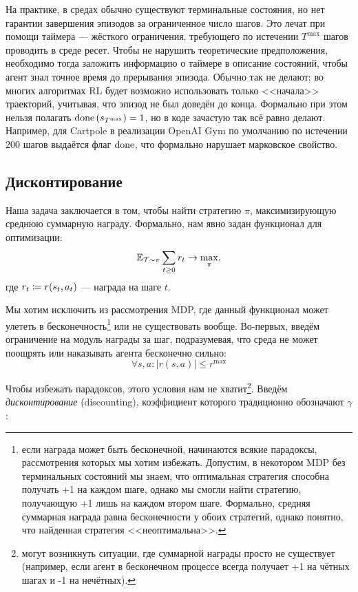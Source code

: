 \begin{remark}
На практике, в средах обычно существуют терминальные состояния, но нет гарантии завершения эпизодов за ограниченное число шагов. Это лечат при помощи таймера --- жёсткого ограничения, требующего по истечении $T^{\max}$ шагов проводить в среде ресет. Чтобы не нарушить теоретические предположения, необходимо тогда заложить информацию о таймере в описание состояний, чтобы агент знал точное время до прерывания эпизода. Обычно так не делают; во многих алгоритмах RL будет возможно использовать только <<начала>> траекторий, учитывая, что эпизод не был доведён до конца. Формально при этом нельзя полагать $\done \left( s_{T^{\max}} \right) \HM= 1$, но в коде зачастую так всё равно делают. Например, для Cartpole в реализации OpenAI Gym по умолчанию по истечении 200 шагов выдаётся флаг $\mathrm{done}$, что формально нарушает марковское свойство.
\end{remark}

\subsection{Дисконтирование}

Наша задача заключается в том, чтобы найти стратегию $\pi$, максимизирующую среднюю суммарную награду. Формально, нам явно задан функционал для оптимизации:
\begin{equation}\label{sumreward}
\mathbb{E}_{\mathcal{T} \sim \pi} \sum_{t \ge 0} r_t \to \max_{\pi},
\end{equation}
где $r_t \HM\coloneqq r(s_t, a_t)$ --- награда на шаге $t$.

Мы хотим исключить из рассмотрения MDP, где данный функционал может улететь в бесконечность\footnote{если награда может быть бесконечной, начинаются всякие парадоксы, рассмотрения которых мы хотим избежать. Допустим, в некотором MDP без терминальных состояний мы знаем, что оптимальная стратегия способна получать +1 на каждом шаге, однако мы смогли найти стратегию, получающую +1 лишь на каждом втором шаге. Формально, средняя суммарная награда равна бесконечности у обоих стратегий, однако понятно, что найденная стратегия <<неоптимальна>>.} или не существовать вообще. Во-первых, введём ограничение на модуль награды за шаг, подразумевая, что среда не может поощрять или наказывать агента бесконечно сильно:
\begin{equation}\label{reward_limit}
\forall s, a \colon |r(s, a)| \le r^{\max}
\end{equation}

Чтобы избежать парадоксов, этого условия нам не хватит\footnote{могут возникнуть ситуации, где суммарной награды просто не существует (например, если агент в бесконечном процессе всегда получает +1 на чётных шагах и -1 на нечётных).}. Введём \emph{дисконтирование} (discounting), коэффициент которого традиционно обозначают $\gamma$:
 
